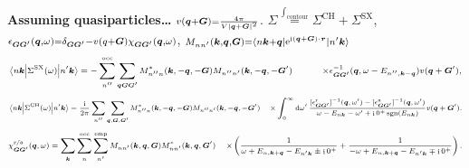 \documentclass[t]{beamer}
\DeclareMathOperator{\ee}{e}
\DeclareMathOperator{\ii}{i}
\DeclareMathOperator{\sgn}{sgn}
\def\\{}%
\begin{document}
\begin{frame}[allowframebreaks]
\textbf{Assuming quasiparticles\dots} 
$\scriptstyle v(\vb*{q} + \vb*{G}) = \frac{4\pi }{V \abs*{\vb*{q} + \vb*{G}}^2}$.
$\scriptstyle \Sigma \stackrel{\int_{\text{contour}}}{=} \Sigma^{\text{CH}} + \Sigma^{\text{SX}}$,
$\scriptstyle \epsilon_{\vb*{G} \vb*{G}'}(\vb*{q}, \omega) = \delta_{\vb*{G} \vb*{G}'} - v(q + \vb*{G}) \chi_{\vb*{G} \vb*{G}'}(\vb*{q}, \omega)$, 
$\scriptstyle M_{n n'}(\vb*{k}, \vb*{q}, \vb*{G}) = \mel*{n \vb*{k} + \vb*{q}}{\ee^{\ii (\vb*{q} + \vb*{G}) \cdot \vb*{r}}}{n' \vb*{k}}$
\begin{equation}
    \scriptsize
    \begin{aligned}
    \mel{n \vb*{k}}{\Sigma^{\text{SX}}(\omega)}{n' \vb*{k}} 
    &= - \sum_{n''}^{\text{occ}} \sum_{\vb*{q} \vb*{G} \vb*{G}'}
    M^*_{n'' n} (\vb*{k}, - \vb*{q}, - \vb*{G}) M_{n'' n'} (\vb*{k}, - \vb*{q},  -\vb*{G}') \\
    &\quad\quad \times  \epsilon^{-1}_{\vb*{G} \vb*{G}'}(\vb*{q}, \omega - E_{n'', \vb*{k} - \vb*{q}}) 
    v(\vb*{q} + \vb*{G}') ,
    \end{aligned}
    \label{eq:sex}
\end{equation}
\begin{equation}
    \scriptsize
    \begin{aligned}
        \mel{n \vb*{k}}{\Sigma^{\text{CH}}(\omega)}{n' \vb*{k}} 
        &= \frac{\ii}{2\pi} \sum_{n''} \sum_{\vb*{q}, \vb*{G}, \vb*{G}'} 
        M^*_{n'' n} (\vb*{k}, - \vb*{q}, - \vb*{G})  M_{n'' n'} (\vb*{k}, - \vb*{q},  -\vb*{G}') \\
        & \times \int_{0}^{\infty} \dd{\omega'} 
        \frac{
            [\epsilon^{\text{r}}_{\vb*{G} \vb*{G}'}]^{-1} (\vb*{q}, \omega')
            - [\epsilon^{\text{a}}_{\vb*{G} \vb*{G}'}]^{-1} (\vb*{q}, \omega') 
        }{\omega - E_{n \vb*{k}} - \omega' + \ii 0^+ \sgn(E_{n \vb*{k}})} v(\vb*{q}+\vb*{G}') .
    \end{aligned}
    \label{eq:coh}
\end{equation}
\begin{equation}
    \scriptsize
    \begin{aligned}
        \chi^{\text{r/a}}_{\vb*{G} \vb*{G}'}(\vb*{q}, \omega)
        &= \sum_{\vb*{k}} \sum_{n}^{\text{occ}} \sum_{n'}^{\text{emp}} 
        M_{n n'} (\vb*{k}, \vb*{q}, \vb*{G}) M^*_{nn'} (\vb*{k}, \vb*{q}, \vb*{G}') \\
        &\times \left(
        \frac{
            1
        }{
            \omega + E_{n, \vb*{k} + \vb*{q}} - E_{n' \vb*{k}} \pm \ii 0^+
        }
        + \frac{
            1
        }{
            - \omega + E_{n, \vb*{k} + \vb*{q}} - E_{n' \vb*{k}} \mp \ii 0^+
        }
        \right).
    \end{aligned}
    \label{eq:chi}
\end{equation}


\end{frame}
\end{document}
